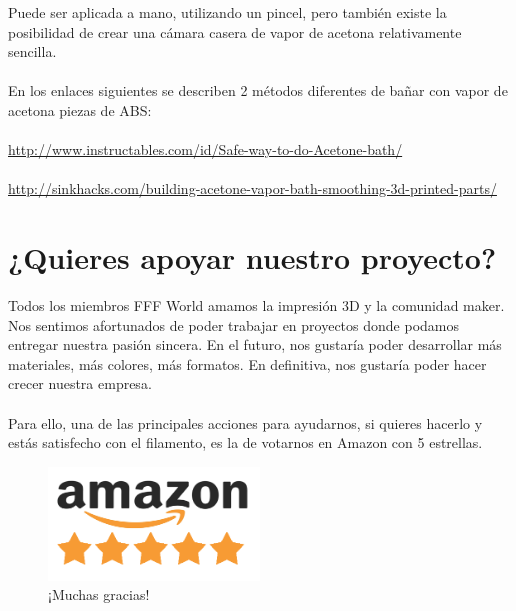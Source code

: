 \documentclass[11pt,a4paper]{article}
\begin{document}
Puede ser aplicada a mano, utilizando un pincel, pero también existe la posibilidad de crear una cámara casera de vapor de acetona relativamente sencilla.
\\\\
En los enlaces siguientes se describen 2 métodos diferentes de bañar con vapor de acetona piezas de ABS:
\\\\
\url{http://www.instructables.com/id/Safe-way-to-do-Acetone-bath/}\\\\
\url{http://sinkhacks.com/building-acetone-vapor-bath-smoothing-3d-printed-parts/}
\section{¿Quieres apoyar nuestro proyecto?}
Todos los miembros FFF World amamos la impresión 3D y la comunidad maker. Nos sentimos afortunados de poder trabajar en proyectos donde podamos entregar nuestra pasión sincera. En el futuro, nos gustaría poder desarrollar más materiales, más colores, más formatos. En definitiva, nos gustaría poder hacer crecer nuestra empresa.
\\\\
Para ello, una de las principales acciones para ayudarnos, si quieres hacerlo y estás satisfecho con el filamento, es la de votarnos en Amazon con 5 estrellas.
\begin{figure}[H]
\centering
\includegraphics[width=0.5\textwidth,cfbox=azul_marcos 1pt 0pt]{FOTOS/AMAZON_FIVE_STARS}
\caption*{¡Muchas gracias!}
\end{figure}
\end{document}
